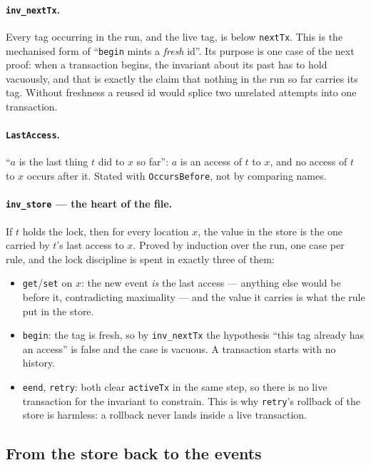 \documentclass[11pt]{article}
\newcommand{\lean}[1]{\texttt{\small #1}}
\begin{document}
\paragraph{\lean{inv\_nextTx}.}
Every tag occurring in the run, and the live tag, is below \lean{nextTx}. This is
the mechanised form of ``\lean{begin} mints a \emph{fresh} id''. Its purpose is
one case of the next proof: when a transaction begins, the invariant about its
past has to hold vacuously, and that is exactly the claim that nothing in the run
so far carries its tag. Without freshness a reused id would splice two unrelated
attempts into one transaction.

\paragraph{\lean{LastAccess}.}
``$a$ is the last thing $t$ did to $x$ so far'': $a$ is an access of $t$ to $x$,
and no access of $t$ to $x$ occurs after it. Stated with \lean{OccursBefore},
not by comparing names.

\paragraph{\lean{inv\_store} --- the heart of the file.}
If $t$ holds the lock, then for every location $x$, the value in the store is the
one carried by $t$'s last access to $x$. Proved by induction over the run, one
case per rule, and the lock discipline is spent in exactly three of them:
\begin{itemize}
  \item \lean{get}/\lean{set} on $x$: the new event \emph{is} the last access ---
        anything else would be before it, contradicting maximality --- and the
        value it carries is what the rule put in the store.
  \item \lean{begin}: the tag is fresh, so by \lean{inv\_nextTx} the hypothesis
        ``this tag already has an access'' is false and the case is vacuous. A
        transaction starts with no history.
  \item \lean{eend}, \lean{retry}: both clear \lean{activeTx} in the same step,
        so there is no live transaction for the invariant to constrain. This is
        why \lean{retry}'s rollback of the store is harmless: a rollback never
        lands inside a live transaction.
\end{itemize}

\subsection{From the store back to the events}
\end{document}
